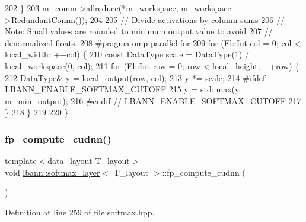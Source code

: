 \begin{DoxyCode}
202     \}
203     \hyperlink{classlbann_1_1Layer_a5de05c52f22e0bbd7c703bec3ad4dbf2}{m\_comm}->\hyperlink{classlbann_1_1lbann__comm_af5631e5f0f54e4df4958eba9df2599ef}{allreduce}(*\hyperlink{classlbann_1_1softmax__layer_a604e614de25758f0072308c7efdd5bdb}{m\_workspace}, \hyperlink{classlbann_1_1softmax__layer_a604e614de25758f0072308c7efdd5bdb}{m\_workspace}->RedundantComm());
204 
205     \textcolor{comment}{// Divide activations by column sums}
206     \textcolor{comment}{// Note: Small values are rounded to minimum output value to avoid}
207     \textcolor{comment}{// denormalized floats.}
208 \textcolor{preprocessor}{    #pragma omp parallel for}
209     \textcolor{keywordflow}{for} (El::Int col = 0; col < local\_width; ++col) \{
210       \textcolor{keyword}{const} DataType scale = DataType(1) / local\_workspace(0, col);
211       \textcolor{keywordflow}{for} (El::Int row = 0; row < local\_height; ++row) \{
212         DataType& y = local\_output(row, col);
213         y *= scale;
214 \textcolor{preprocessor}{      #ifdef LBANN\_ENABLE\_SOFTMAX\_CUTOFF}
215         y = std::max(y, \hyperlink{classlbann_1_1softmax__layer_ab3bf2d92f4441923dd0b792c38ec774a}{m\_min\_output});
216 \textcolor{preprocessor}{      #endif // LBANN\_ENABLE\_SOFTMAX\_CUTOFF}
217       \}
218     \}
219 
220   \}
\end{DoxyCode}
\mbox{\label{classlbann_1_1softmax__layer_a5f2e55d32c4042e5da736b6eb5553e82}} 
\subsubsection{\texorpdfstring{fp\+\_\+compute\+\_\+cudnn()}{fp\_compute\_cudnn()}}
{\footnotesize\ttfamily template$<$data\+\_\+layout T\+\_\+layout$>$ \\
void \hyperlink{classlbann_1_1softmax__layer}{lbann\+::softmax\+\_\+layer}$<$ T\+\_\+layout $>$\+::fp\+\_\+compute\+\_\+cudnn (\begin{DoxyParamCaption}{ }\end{DoxyParamCaption})\hspace{0.3cm}{\ttfamily [inline]}}



Definition at line 259 of file softmax.\+hpp.


